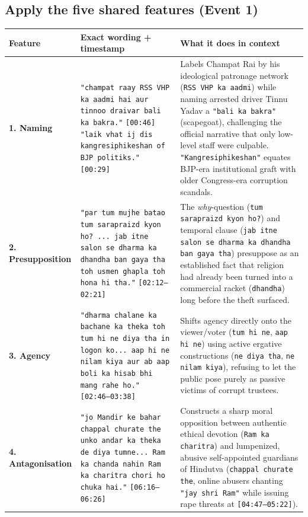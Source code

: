 \documentclass[10pt,a4paper]{article}
\begin{document}
\subsection*{Apply the five shared features (Event 1)}
\begin{longtable}{@{}>{\raggedright\arraybackslash}p{} >{\raggedright\arraybackslash}p{} >{\raggedright\arraybackslash}p{}@{}}
\toprule
\textbf{Feature} & \textbf{Exact wording + timestamp} & \textbf{What it does in context} \\
\midrule
\endhead
\textbf{1. Naming} & \texttt{"champat raay RSS VHP ka aadmi hai aur tinnoo draivar bali ka bakra."} \texttt{[00:46]} \newline  \texttt{"laik vhat ij dis kangresiphikeshan of BJP politiks."} \texttt{[00:29]} & Labels Champat Rai by his ideological patronage network (\texttt{RSS VHP ka aadmi}) while naming arrested driver Tinnu Yadav a \texttt{"bali ka bakra"} (scapegoat), challenging the official narrative that only low-level staff were culpable. \texttt{"Kangresiphikeshan"} equates BJP-era institutional graft with older Congress-era corruption scandals. \\
\addlinespace[4pt]
\textbf{2. Presupposition} & \texttt{"par tum mujhe batao tum sarapraizd kyon ho? ... jab itne salon se dharma ka dhandha ban gaya tha toh usmen ghapla toh hona hi tha."} \texttt{[02:12--02:21]} & The \textit{why}-question (\texttt{tum sarapraizd kyon ho?}) and temporal clause (\texttt{jab itne salon se dharma ka dhandha ban gaya tha}) presuppose as an established fact that religion had already been turned into a commercial racket (\texttt{dhandha}) long before the theft surfaced. \\
\addlinespace[4pt]
\textbf{3. Agency} & \texttt{"dharma chalane ka bachane ka theka toh tum hi ne diya tha in logon ko... aap hi ne nilam kiya aur ab aap boli ka hisab bhi mang rahe ho."} \texttt{[02:46--03:38]} & Shifts agency directly onto the viewer/voter (\texttt{tum hi ne}, \texttt{aap hi ne}) using active ergative constructions (\texttt{ne diya tha}, \texttt{ne nilam kiya}), refusing to let the public pose purely as passive victims of corrupt trustees. \\
\addlinespace[4pt]
\textbf{4. Antagonisation} & \texttt{"jo Mandir ke bahar chappal churate the unko andar ka theka de diya tumne... Ram ka chanda nahin Ram ka charitra chori ho chuka hai."} \texttt{[06:16--06:26]} & Constructs a sharp moral opposition between authentic ethical devotion (\texttt{Ram ka charitra}) and lumpenized, abusive self-appointed guardians of Hindutva (\texttt{chappal churate the}, online abusers chanting \texttt{"jay shri Ram"} while issuing rape threats at \texttt{[04:47--05:22]}). \\

\end{longtable}
\end{document}
